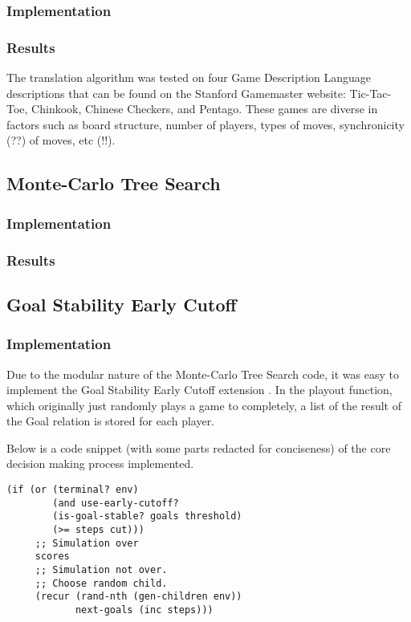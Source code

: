 \documentclass[letterpaper]{article}
\begin{document}
\subsubsection{Implementation}

\subsubsection{Results}
The translation algorithm was tested on four Game Description Language descriptions that can be found on the Stanford Gamemaster website: Tic-Tac-Toe, Chinkook, Chinese Checkers, and Pentago. These games are diverse in factors such as board structure, number of players, types of moves, synchronicity (??) of moves, etc (!!).

\subsection{Monte-Carlo Tree Search}

\subsubsection{Implementation}

\subsubsection{Results}

\subsection{Goal Stability Early Cutoff}
\subsubsection{Implementation}
Due to the modular nature of the Monte-Carlo Tree Search code, it was easy to implement the Goal Stability Early Cutoff extension \cite{finnsson2012generalized}. In the playout function, which originally just randomly plays a game to completely, a list of the result of the Goal relation is stored for each player.

Below is a code snippet (with some parts redacted for conciseness) of the core decision making process implemented.
\begin{lstlisting}[frame=single,caption=Clojure implementation of Goal Stability Early Cutoff]
(if (or (terminal? env)
        (and use-early-cutoff?
        (is-goal-stable? goals threshold)
        (>= steps cut)))
     ;; Simulation over
     scores
     ;; Simulation not over.
     ;; Choose random child.
     (recur (rand-nth (gen-children env)) 
            next-goals (inc steps)))
\end{lstlisting}
\end{document}
